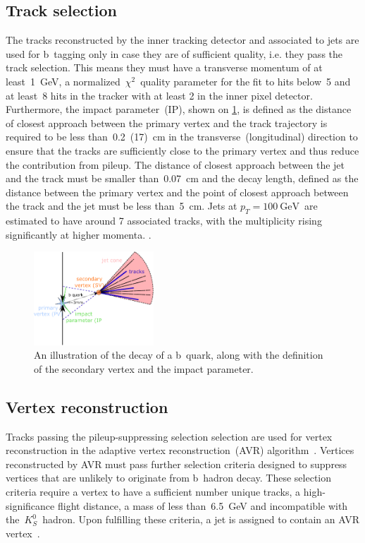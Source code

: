 \subsection{Track selection}
The tracks reconstructed by the inner tracking detector and associated to jets are used for b~tagging only in case they are of sufficient quality, i.e. they pass the track selection. This means they must have a transverse momentum of at least~1~GeV, a normalized~$\chi^2$~quality parameter for the fit to hits below~5 and at least~8 hits in the tracker with at least 2 in the inner pixel detector. Furthermore, the impact parameter~(IP), shown on \cref{fig:btag_ip}, is defined as the distance of closest approach between the primary vertex and the track trajectory is required to be less than~0.2~(17)~cm in the transverse~(longitudinal) direction to ensure that the tracks are sufficiently close to the primary vertex and thus reduce the contribution from pileup. The distance of closest approach between the jet and the track must be smaller than~0.07~cm and the decay length, defined as the distance between the primary vertex and the point of closest approach between the track and the jet must be less than~5~cm. Jets at $p_T = 100~\mathrm{GeV}$~are estimated to have around 7 associated tracks, with the multiplicity rising significantly at higher momenta. \cite{CMS-PAS-BTV-15-001}.

\begin{figure}
\begin{centering}
\includegraphics[width=0.4\textwidth]{figures/btv/ip.pdf}
\caption[Illustration of b~quark decay]{An illustration of the decay of a b~quark, along with the definition of the secondary vertex and the impact parameter.}
\label{fig:btag_ip}
\end{centering}
\end{figure}


\subsection{Vertex reconstruction}
Tracks passing the pileup-suppressing selection selection are used for vertex reconstruction in the adaptive vertex reconstruction~(AVR) algorithm~\cite{Waltenberger:2008zz}. Vertices reconstructed by AVR must pass further selection criteria designed to suppress vertices that are unlikely to originate from b~hadron decay. These selection criteria require a vertex to have a sufficient number unique tracks, a high-significance flight distance, a mass of less than~6.5~GeV and incompatible with the~$K_S^0$~hadron. Upon fulfilling these criteria, a jet is assigned to contain an AVR vertex~\cite{CMS-PAS-BTV-15-001}.

